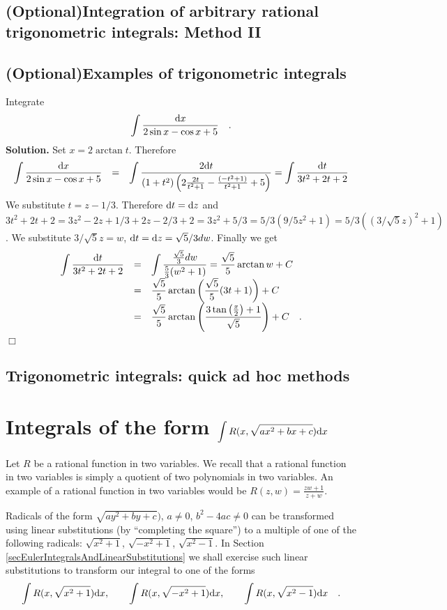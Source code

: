 \documentclass[12pt]{book}
\newenvironment{solution}{\medskip\noindent\textbf{Solution.} }{$\Box$}
\newcommand{\optionalMaterial}{\textbf{(Optional)}}
\begin{document}
\subsection{\optionalMaterial Integration of arbitrary rational trigonometric integrals: Method II}

\subsection{\optionalMaterial Examples of trigonometric integrals}
Integrate
\[
\int \frac{{\normalfont \text{d}} x}{2\sin x-\cos x +5}\quad .
\]
\begin{solution}
Set $x=2\arctan t$. Therefore
\[
\begin{array}{rcl}
\displaystyle \int \frac{{\normalfont \text{d}} x}{2\sin x-\cos x +5}&=&\displaystyle \int \frac{2{\normalfont \text{d}} t}{(1+t^2)\left(2\frac{2t}{t^2+1}- \frac{(-t^2+1) }{t^2+1}+5\right)}= \int \frac{{\normalfont \text{d}} t}{3t^2+2t+2}
\end{array}
\]
We substitute $t=z-1/3$. Therefore ${\normalfont \text{d}} t={\normalfont \text{d}} z$ and $3t^2+2t+2=3z^2-2z+1/3+2z-2/3+2=3z^2+5/3= 5/3(9/5z^2+1)= 5/3((3/\sqrt{5}z)^2+1)$. We substitute $3/\sqrt{5}z=w$, ${\normalfont \text{d}} t={\normalfont \text{d}} z=\sqrt{5}/3dw$. Finally we get
\[
\begin{array}{rcl}
\displaystyle \int \frac{{\normalfont \text{d}} t}{3t^2+2t+2}&=& \displaystyle \int \frac{\frac{\sqrt{5}}{3}dw}{\frac{5}{3}(w^2+1)}= \frac{\sqrt{5}}{5}\arctan w+C\\
&=&\displaystyle \frac{\sqrt{5}}{5}\arctan\left( \frac{\sqrt{5}}{5}(3t+1) \right)+C\\
&=&\displaystyle \frac{\sqrt{5}}{5}\arctan \left(\frac{3\tan \left(\frac{x}{2}\right)+1}{\sqrt{5}}\right)+C\quad .
\end{array}
\]
\end{solution}
\subsection{Trigonometric integrals: quick ad hoc methods}

\section{Integrals of the form $\displaystyle \int R(x, \sqrt{ax^2+bx+c}) {\normalfont \text{d}} x$}
Let $R$ be a rational function in two variables. We recall that a rational function in two variables is simply a quotient of two polynomials in two variables. An example of a rational function in two variables would be $R(z,w)= \frac{zw+1}{z+w}$.

Radicals of the form  $\sqrt{ay^2+by+c})$, $a\neq 0$, $b^2-4ac\neq 0$ can be transformed using linear substitutions (by ``completing the square'') to a multiple of one of the following radicals: $\sqrt{x^2+1}$, $\sqrt{-x^2+1}$,  $\sqrt{x^2-1}$. In Section \ref{secEulerIntegralsAndLinearSubstitutions} we shall exercise such linear substitutions to transform our integral to one of the forms
\begin{equation}\label{eqIntegralQuadraticRadicalX}
\int R(x, \sqrt{x^2+1}){\normalfont \text{d}} x,\qquad  \int R(x, \sqrt{-x^2+1}){\normalfont \text{d}} x, \qquad  \int R(x, \sqrt{x^2-1}){\normalfont \text{d}} x\quad .
\end{equation}
\end{document}
